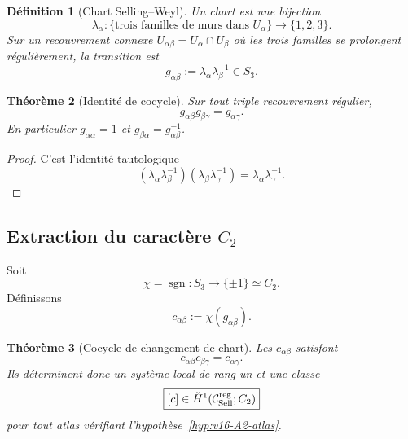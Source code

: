 \documentclass[11pt,a4paper]{article}
\newtheorem{theorem}{Théorème}[section]
\newtheorem{definition}[theorem]{Définition}
\begin{document}
\begin{definition}[Chart Selling--Weyl]\label{def:v16-chart}
Un chart est une bijection
\[
 \lambda_\alpha:
 \{\text{trois familles de murs dans }U_\alpha\}
 \longrightarrow
 \{1,2,3\}.
\]
Sur un recouvrement connexe $U_{\alpha\beta}=U_\alpha\cap U_\beta$ où les trois familles se prolongent régulièrement, la transition est
\begin{equation}\label{eq:v16-gab}
 \boxed{
 g_{\alpha\beta}
 :=
 \lambda_\alpha\lambda_\beta^{-1}
 \in S_3.}
\end{equation}
\end{definition}

\begin{theorem}[Identité de cocycle]\label{thm:v16-S3-cocycle}
Sur tout triple recouvrement régulier,
\begin{equation}\label{eq:v16-S3-cocycle}
 \boxed{
 g_{\alpha\beta}g_{\beta\gamma}
 =
 g_{\alpha\gamma}.}
\end{equation}
En particulier $g_{\alpha\alpha}=1$ et $g_{\beta\alpha}=g_{\alpha\beta}^{-1}$.
\end{theorem}

\begin{proof}
C'est l'identité tautologique
\[
 (\lambda_\alpha\lambda_\beta^{-1})
 (\lambda_\beta\lambda_\gamma^{-1})
 =
 \lambda_\alpha\lambda_\gamma^{-1}.
\]
\end{proof}

\subsection{Extraction du caractère \texorpdfstring{$C_2$}{C2}}

Soit
\[
 \chi=\operatorname{sgn}:S_3\to\{\pm1\}\simeq C_2.
\]
Définissons
\begin{equation}\label{eq:v16-chi}
 \boxed{
 c_{\alpha\beta}
 :=
 \chi(g_{\alpha\beta}).}
\end{equation}

\begin{theorem}[Cocycle de changement de chart]\label{thm:v16-C2-cocycle}
Les $c_{\alpha\beta}$ satisfont
\[
 \boxed{
 c_{\alpha\beta}c_{\beta\gamma}
 =
 c_{\alpha\gamma}.}
\]
Ils déterminent donc un système local de rang un et une classe
\begin{equation}\label{eq:v16-H1-class}
 \boxed{
 [c]\in
 \check H^1(\mathcal C_{\rm Sell}^{\rm reg};C_2)}
\end{equation}
pour tout atlas vérifiant l'hypothèse~\ref{hyp:v16-A2-atlas}.
\end{theorem}
\end{document}
